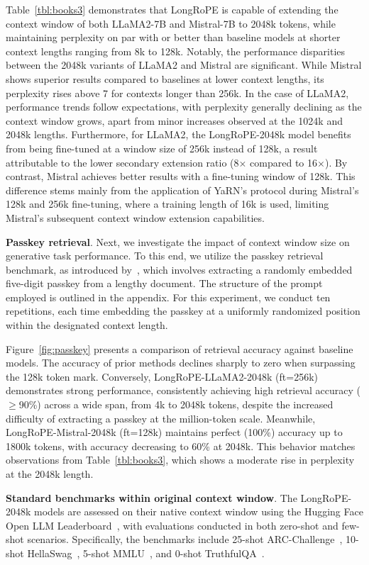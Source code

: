 Table~\ref{tbl:books3} demonstrates that LongRoPE is capable of extending the context window of both LLaMA2-7B and Mistral-7B to 2048k tokens, while maintaining perplexity on par with or better than baseline models at shorter context lengths ranging from 8k to 128k. Notably, the performance disparities between the 2048k variants of LLaMA2 and Mistral are significant. While Mistral shows superior results compared to baselines at lower context lengths, its perplexity rises above 7 for contexts longer than 256k. In the case of LLaMA2, performance trends follow expectations, with perplexity generally declining as the context window grows, apart from minor increases observed at the 1024k and 2048k lengths. Furthermore, for LLaMA2, the LongRoPE-2048k model benefits from being fine-tuned at a window size of 256k instead of 128k, a result attributable to the lower secondary extension ratio (8$\times$ compared to 16$\times$). By contrast, Mistral achieves better results with a fine-tuning window of 128k. This difference stems mainly from the application of YaRN's protocol during Mistral's 128k and 256k fine-tuning, where a training length of 16k is used, limiting Mistral's subsequent context window extension capabilities.

\textbf{Passkey retrieval}. Next, we investigate the impact of context window size on generative task performance. To this end, we utilize the passkey retrieval benchmark, as introduced by~\cite{passkey}, which involves extracting a randomly embedded five-digit passkey from a lengthy document. The structure of the prompt employed is outlined in the appendix. For this experiment, we conduct ten repetitions, each time embedding the passkey at a uniformly randomized position within the designated context length.

Figure~\ref{fig:passkey} presents a comparison of retrieval accuracy against baseline models. The accuracy of prior methods declines sharply to zero when surpassing the 128k token mark. Conversely, LongRoPE-LLaMA2-2048k (ft=256k) demonstrates strong performance, consistently achieving high retrieval accuracy ($\ge$90\%) across a wide span, from 4k to 2048k tokens, despite the increased difficulty of extracting a passkey at the million-token scale. Meanwhile, LongRoPE-Mistral-2048k (ft=128k) maintains perfect (100\%) accuracy up to 1800k tokens, with accuracy decreasing to 60\% at 2048k. This behavior matches observations from Table~\ref{tbl:books3}, which shows a moderate rise in perplexity at the 2048k length.

\textbf{Standard benchmarks within original context window}. The LongRoPE-2048k models are assessed on their native context window using the Hugging Face Open LLM Leaderboard~\cite{huggingfaceboard}, with evaluations conducted in both zero-shot and few-shot scenarios. Specifically, the benchmarks include 25-shot ARC-Challenge~\cite{allenai:arc}, 10-shot HellaSwag~\cite{zellers2019hellaswag}, 5-shot MMLU~\cite{mmlu}, and 0-shot TruthfulQA~\cite{lin2021truthfulqa}.

